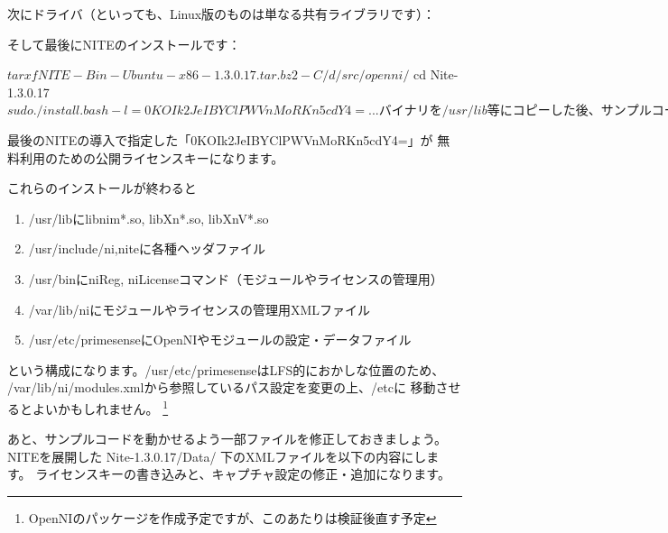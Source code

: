 \documentclass[mingoth,a4paper]{jsarticle}
\begin{document}
次にドライバ（といっても、Linux版のものは単なる共有ライブラリです）：

そして最後にNITEのインストールです：
\begin{commandline}
$ tar xf NITE-Bin-Ubuntu-x86-1.3.0.17.tar.bz2 -C /d/src/openni/
$ cd Nite-1.3.0.17
$ sudo ./install.bash -l=0KOIk2JeIBYClPWVnMoRKn5cdY4=
...バイナリを/usr/lib等にコピーした後、サンプルコードをビルドする...
$
\end{commandline}

最後のNITEの導入で指定した「0KOIk2JeIBYClPWVnMoRKn5cdY4=」が
無料利用のための公開ライセンスキーになります。

これらのインストールが終わると
\begin{enumerate}
\item /usr/libにlibnim*.so, libXn*.so, libXnV*.so
\item /usr/include/{ni,nite}に各種ヘッダファイル
\item /usr/binにniReg, niLicenseコマンド（モジュールやライセンスの管理用）
\item /var/lib/niにモジュールやライセンスの管理用XMLファイル
\item /usr/etc/primesenseにOpenNIやモジュールの設定・データファイル
\end{enumerate}
という構成になります。/usr/etc/primesenseはLFS的におかしな位置のため、
/var/lib/ni/modules.xmlから参照しているパス設定を変更の上、/etcに
移動させるとよいかもしれません。
\footnote{OpenNIのパッケージを作成予定ですが、このあたりは検証後直す予定}

あと、サンプルコードを動かせるよう一部ファイルを修正しておきましょう。
NITEを展開した Nite-1.3.0.17/Data/ 下のXMLファイルを以下の内容にします。
ライセンスキーの書き込みと、キャプチャ設定の修正・追加になります。
\end{document}
